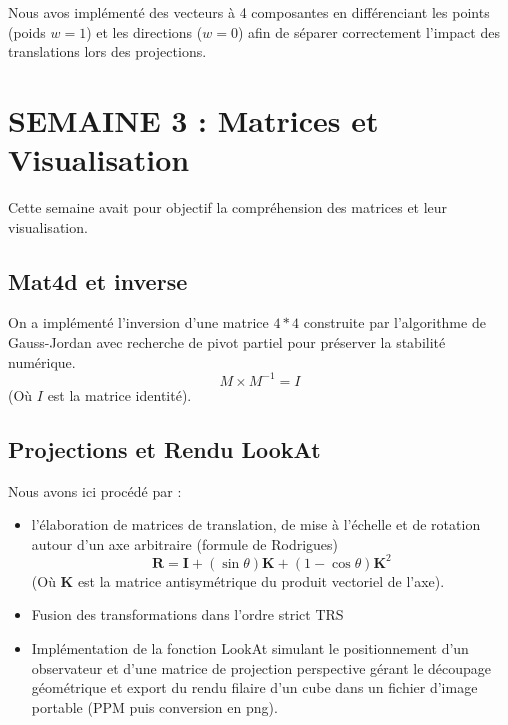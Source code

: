 \documentclass[12pt,a4paper]{report}
\begin{document}
Nous avos implémenté des vecteurs à 4 composantes en différenciant les points (poids $w=1$) et les directions ($w=0$) afin de séparer correctement l'impact des translations lors des projections.


\chapter{SEMAINE 3 : Matrices et Visualisation}

Cette semaine avait pour objectif la compréhension des matrices et leur visualisation.

\section{Mat4d et inverse}

On a implémenté l'inversion d'une matrice $4*4$ construite par l'algorithme de Gauss-Jordan avec recherche de pivot partiel pour préserver la stabilité numérique.
 $$M \times M^{-1} = I$$ \quad (Où $I$ est la matrice identité).


\section{Projections et Rendu LookAt}

Nous avons ici procédé par :
\begin{itemize}
    \item l'élaboration de matrices de translation, de mise à l'échelle et de rotation autour d'un axe arbitraire (formule de Rodrigues)   $$\mathbf{R} = \mathbf{I} + (\sin \theta)\mathbf{K} + (1 - \cos \theta)\mathbf{K}^2$$  \quad (Où $\mathbf{K}$ est la matrice antisymétrique du produit vectoriel de l'axe).
    \item Fusion des transformations dans l'ordre strict TRS
    \item Implémentation de la fonction LookAt simulant le positionnement d'un observateur et d'une matrice de projection perspective gérant le découpage géométrique et export du rendu filaire d'un cube dans un fichier d'image portable (PPM puis conversion en png).
\end{itemize}


\end{document}
